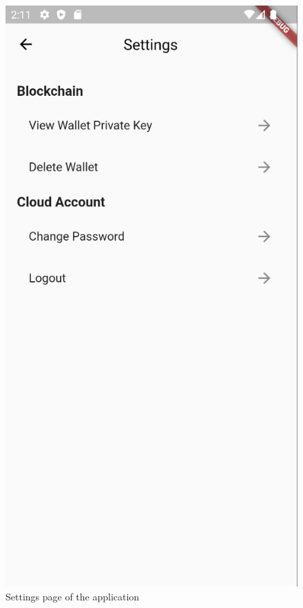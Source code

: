 \documentclass[a4paper,12pt]{report}
\begin{document}
\begin{figure}[H]
    \centering
    \includegraphics[scale=0.45]{images/app/settings.png}
    \caption{Settings page of the application}\label{fig:settings}
\end{figure}
\end{document}
